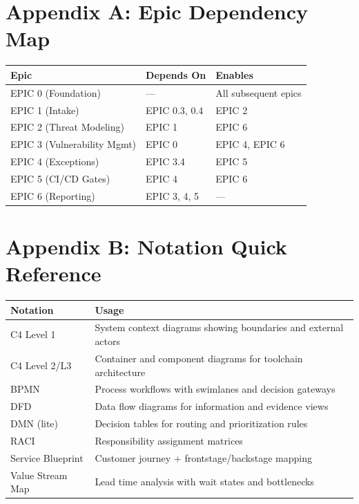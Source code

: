 \documentclass[11pt,letterpaper]{article}
\begin{document}
\newpage
\section*{Appendix A: Epic Dependency Map}

\begin{center}
\renewcommand{\arraystretch}{1.4}
\begin{tabular}{lll}
\toprule
\textbf{Epic} & \textbf{Depends On} & \textbf{Enables} \\
\midrule
EPIC 0 (Foundation) & --- & All subsequent epics \\
EPIC 1 (Intake) & EPIC 0.3, 0.4 & EPIC 2 \\
EPIC 2 (Threat Modeling) & EPIC 1 & EPIC 6 \\
EPIC 3 (Vulnerability Mgmt) & EPIC 0 & EPIC 4, EPIC 6 \\
EPIC 4 (Exceptions) & EPIC 3.4 & EPIC 5 \\
EPIC 5 (CI/CD Gates) & EPIC 4 & EPIC 6 \\
EPIC 6 (Reporting) & EPIC 3, 4, 5 & --- \\
\bottomrule
\end{tabular}
\end{center}

\vspace{2cm}

\section*{Appendix B: Notation Quick Reference}

\begin{center}
\renewcommand{\arraystretch}{1.4}
\begin{tabular}{p{4cm}p{9cm}}
\toprule
\textbf{Notation} & \textbf{Usage} \\
\midrule
C4 Level 1 & System context diagrams showing boundaries and external actors \\
C4 Level 2/L3 & Container and component diagrams for toolchain architecture \\
BPMN & Process workflows with swimlanes and decision gateways \\
DFD & Data flow diagrams for information and evidence views \\
DMN (lite) & Decision tables for routing and prioritization rules \\
RACI & Responsibility assignment matrices \\
Service Blueprint & Customer journey + frontstage/backstage mapping \\
Value Stream Map & Lead time analysis with wait states and bottlenecks \\
\bottomrule
\end{tabular}
\end{center}
\end{document}
